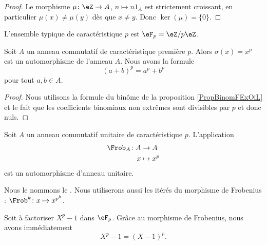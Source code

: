 \begin{proof}
    Le morphisme \( \mu\colon \eZ\to A\), \( n\mapsto n 1_A\) est strictement croissant, en particulier \( \mu(x)\neq \mu(y)\) dès que \( x\neq y\). Donc \( \ker(\mu)=\{ 0 \}\).
\end{proof}

L'ensemble typique de caractéristique \( p\) est \( \eF_p=\eZ/p\eZ\).



\begin{proposition}     \label{Propqrrdem}
    Soit \( A\) un anneau commutatif de caractéristique première \( p\). Alors \( \sigma(x)=x^p\) est un automorphisme de l'anneau \( A\). Nous avons la formule
    \begin{equation}
        (a+b)^p=a^p+b^p
    \end{equation}
    pour tout \( a,b\in A\).
\end{proposition}

\begin{proof}
    Nous utilisons la formule du binôme de la proposition \ref{PropBinomFExOiL} et le fait que les coefficients binomiaux non extrêmes sont divisibles par \( p\) et donc nuls.
\end{proof}

\begin{proposition} \label{PropFrobHAMkTY}
    Soit \( A\) un anneau commutatif unitaire de caractéristique \( p\). L'application
    \begin{equation}
        \begin{aligned}
            \Frob_A\colon A&\to A \\
            x&\mapsto x^p 
        \end{aligned}
    \end{equation}
    est un automorphisme d'anneau unitaire.
\end{proposition}
Nous le nommons le . Nous utiliserons aussi les itérés du morphisme de Frobenius : \( \Frob^k\colon x\mapsto x^{p^k}\).

\begin{example}
    Soit à factoriser \( X^p-1\) dans \( \eF_p\). Grâce au morphisme de Frobenius, nous avons immédiatement
    \begin{equation}
        X^p-1=(X-1)^p.
    \end{equation}
\end{example}

